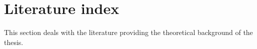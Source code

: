 \section{Literature index}
\label{sec:literature-index}
This section deals with the literature providing the theoretical background of the thesis.
\cite{PicozziHepburnConnor2017}
\cite{Morris2017}
\cite{Newman2015}
\cite{HohpeWoolf2003}
\cite{DockerDoc}
\cite{MartinFowlerBlog}
\cite{OpenshiftDoc}



